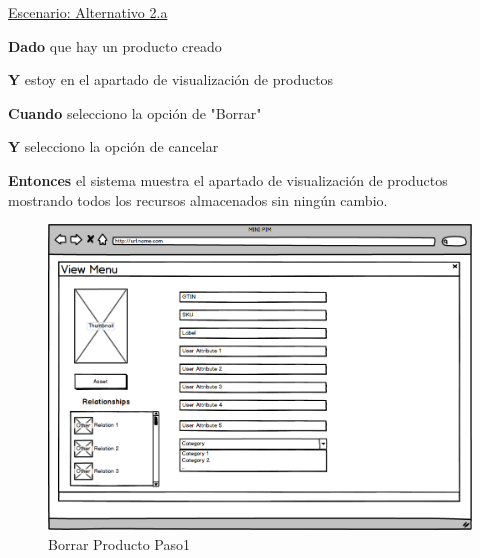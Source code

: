 \underline{Escenario: Alternativo 2.a}\par
\vspace{0.15cm}
\textbf{Dado} que hay un producto creado\par
\textbf{Y} estoy en el apartado de visualización de productos\par
\textbf{Cuando} selecciono la opción de "Borrar"\par
\textbf{Y} selecciono la opción de cancelar\par
\textbf{Entonces} el sistema muestra el apartado de visualización de productos mostrando todos los recursos almacenados sin ningún cambio.\par
\vspace{0.20cm}

\begin{figure}[H]
    \includegraphics[width=1\linewidth]{mockups/RF2.X_MostrarProducto(Menu visualizacion).png}
    \caption{Borrar Producto Paso1}
   \end{figure}
\vspace{1.0cm}


\newpage %